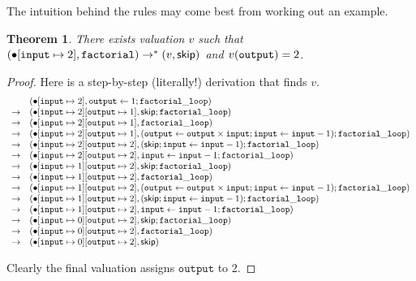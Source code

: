 \documentclass{amsbook}
\newtheorem{theorem}{Theorem}[chapter]
\theoremstyle{definition}
\theoremstyle{remark}
\numberwithin{section}{chapter}
\numberwithin{equation}{chapter}
\begin{document}
The intuition behind the rules may come best from working out an example.

\newcommand{\smallsteps}[2]{#1 \to^* #2}

\begin{theorem}
  There exists valuation $v$ such that $\smallsteps{(\mupd{\mempty}{\mathtt{input}}{2}, \mathtt{factorial})}{(v, \skipe)}$ and $v(\mathtt{output}) = 2$.
\end{theorem}

\begin{proof}
  Here is a step-by-step (literally!) derivation that finds $v$.
  $$\begin{array}{cl}
    & (\bullet[\mathtt{input} \mapsto 2], \mathtt{output} \leftarrow 1; \mathtt{factorial\_loop}) \\
    \to & (\bullet[\mathtt{input} \mapsto 2][\mathtt{output} \mapsto 1], \mathsf{skip}; \mathtt{factorial\_loop}) \\
    \to & (\bullet[\mathtt{input} \mapsto 2][\mathtt{output} \mapsto 1], \mathtt{factorial\_loop}) \\
    \to & (\bullet[\mathtt{input} \mapsto 2][\mathtt{output} \mapsto 1], (\mathtt{output} \leftarrow \mathtt{output} \times \mathtt{input}; \mathtt{input} \leftarrow \mathtt{input} - 1); \mathtt{factorial\_loop}) \\
    \to & (\bullet[\mathtt{input} \mapsto 2][\mathtt{output} \mapsto 2], (\mathsf{skip}; \mathtt{input} \leftarrow \mathtt{input} - 1); \mathtt{factorial\_loop}) \\
    \to & (\bullet[\mathtt{input} \mapsto 2][\mathtt{output} \mapsto 2], \mathtt{input} \leftarrow \mathtt{input} - 1; \mathtt{factorial\_loop}) \\
    \to & (\bullet[\mathtt{input} \mapsto 1][\mathtt{output} \mapsto 2], \mathsf{skip}; \mathtt{factorial\_loop}) \\
    \to & (\bullet[\mathtt{input} \mapsto 1][\mathtt{output} \mapsto 2], \mathtt{factorial\_loop}) \\
    \to & (\bullet[\mathtt{input} \mapsto 1][\mathtt{output} \mapsto 2], (\mathtt{output} \leftarrow \mathtt{output} \times \mathtt{input}; \mathtt{input} \leftarrow \mathtt{input} - 1); \mathtt{factorial\_loop}) \\
    \to & (\bullet[\mathtt{input} \mapsto 1][\mathtt{output} \mapsto 2], (\mathsf{skip}; \mathtt{input} \leftarrow \mathtt{input} - 1); \mathtt{factorial\_loop}) \\
    \to & (\bullet[\mathtt{input} \mapsto 1][\mathtt{output} \mapsto 2], \mathtt{input} \leftarrow \mathtt{input} - 1; \mathtt{factorial\_loop}) \\
    \to & (\bullet[\mathtt{input} \mapsto 0][\mathtt{output} \mapsto 2], \mathsf{skip}; \mathtt{factorial\_loop}) \\
    \to & (\bullet[\mathtt{input} \mapsto 0][\mathtt{output} \mapsto 2], \mathtt{factorial\_loop}) \\
    \to & (\bullet[\mathtt{input} \mapsto 0][\mathtt{output} \mapsto 2], \mathsf{skip})
  \end{array}$$

  Clearly the final valuation assigns $\mathtt{output}$ to 2.
\end{proof}
\end{document}
